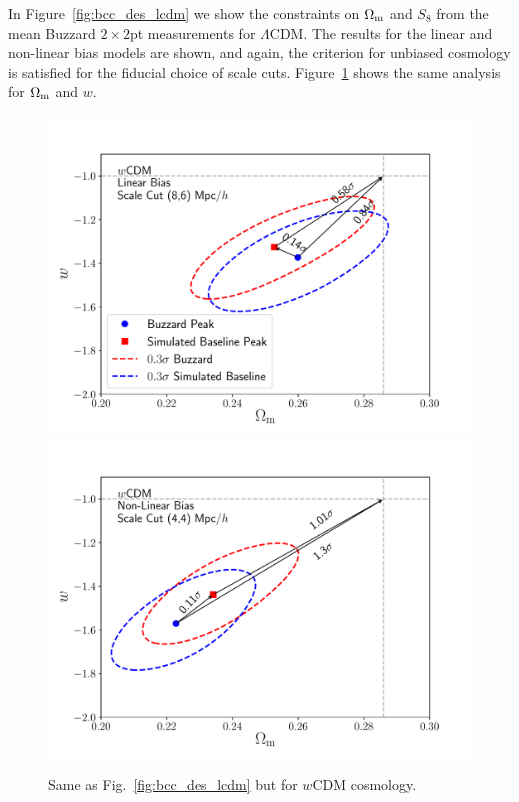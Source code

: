 \documentclass[aps, prd,twocolumn,superscriptaddress,nofootinbib,preprintnumbers]{revtex4-1}
\newcommand{\lcdm}{$\Lambda$CDM}
\newcommand\fig[1]{Figure~\ref{#1}}
\begin{document}
In \fig{fig:bcc_des_lcdm} we show the constraints on $\Omega_{\rm m}$ and $S_8$ from the mean Buzzard $2\times2$pt measurements for \lcdm. The results for the linear and non-linear bias models are shown, and again, the criterion for unbiased cosmology is satisfied for the fiducial choice of scale cuts. \fig{fig:bcc_des_wcdm} shows the same analysis for $\Omega_{\rm m}$ and $w$.

\begin{figure}
\includegraphics[width=\columnwidth]{figs/Buzzard_linbias86_2x2pt_wcdm.pdf}
\includegraphics[width=\columnwidth]{figs/Buzzard_nlbias44_2x2pt_wcdm.pdf}
\caption[]{Same as Fig.~\ref{fig:bcc_des_lcdm} but for $w$CDM cosmology.
}
\label{fig:bcc_des_wcdm}
\end{figure}
\end{document}
